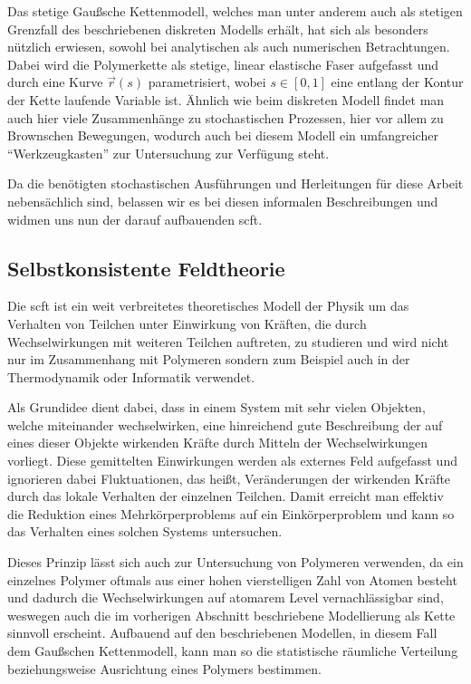Das stetige Gaußsche Kettenmodell, welches man unter anderem auch als stetigen Grenzfall des beschriebenen diskreten Modells erhält, hat sich als besonders nützlich erwiesen, sowohl bei analytischen als auch numerischen Betrachtungen.
Dabei wird die Polymerkette als stetige, linear elastische Faser aufgefasst und durch eine Kurve $\vec{r}(s)$ parametrisiert, wobei $s \in [0, 1]$ eine entlang der Kontur der Kette laufende Variable ist.
Ähnlich wie beim diskreten Modell findet man auch hier viele Zusammenhänge zu stochastischen Prozessen, hier vor allem zu Brownschen Bewegungen,
wodurch auch bei diesem Modell ein umfangreicher \enquote{Werkzeugkasten} zur Untersuchung zur Verfügung steht.

Da die benötigten stochastischen Ausführungen und Herleitungen für diese Arbeit nebensächlich sind, belassen wir es bei diesen informalen Beschreibungen und widmen uns nun der darauf aufbauenden \ac{scft}.


\subsection*{Selbstkonsistente Feldtheorie} %

Die \acl{scft} ist ein weit verbreitetes theoretisches Modell der Physik um das Verhalten von Teilchen unter Einwirkung von Kräften, die durch Wechselwirkungen mit weiteren Teilchen auftreten, zu studieren und wird nicht nur im Zusammenhang mit Polymeren sondern zum Beispiel auch in der Thermodynamik oder Informatik verwendet.

Als Grundidee dient dabei, dass in einem System mit sehr vielen Objekten, welche miteinander wechselwirken, eine hinreichend gute Beschreibung der auf eines dieser Objekte wirkenden Kräfte durch Mitteln der Wechselwirkungen vorliegt.
Diese gemittelten Einwirkungen werden als externes Feld aufgefasst und ignorieren dabei Fluktuationen, das heißt, Veränderungen der wirkenden Kräfte durch das lokale Verhalten der einzelnen Teilchen.
Damit erreicht man effektiv die Reduktion eines Mehrkörperproblems auf ein Einkörperproblem und kann so das Verhalten eines solchen Systems untersuchen.

Dieses Prinzip lässt sich auch zur Untersuchung von Polymeren verwenden,
da ein einzelnes Polymer oftmals aus einer hohen vierstelligen Zahl von Atomen besteht und dadurch die Wechselwirkungen auf atomarem Level vernachlässigbar sind, weswegen auch die im vorherigen Abschnitt beschriebene Modellierung als Kette sinnvoll erscheint.
Aufbauend auf den beschriebenen Modellen, in diesem Fall dem Gaußschen Kettenmodell, kann man so die statistische räumliche Verteilung beziehungsweise Ausrichtung eines Polymers bestimmen.


